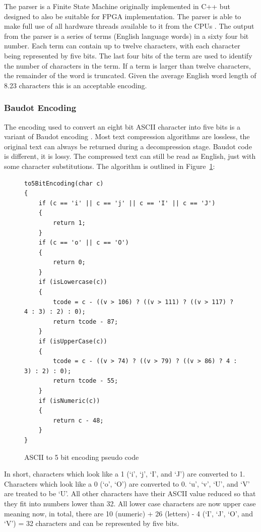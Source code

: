The parser is a Finite State Machine originally implemented in C++ but designed
to also be suitable for FPGA implementation. The parser is able to make full use
of all hardware threads available to it from the CPUs \cite{HybridCPUFPGA}. The
output from the parser is a series of terms (English language words) in a sixty
four bit number. Each term can contain up to twelve characters, with each
character being represented by five bits. The last four bits of the term are
used to identify the number of characters in the term. If a term is larger than
twelve characters, the remainder of the word is truncated. Given the average
English word length of 8.23 characters \cite{englishWordLength} this is an
acceptable encoding.

\subsubsection{Baudot Encoding}

The encoding used to convert an eight bit ASCII character into five bits is a
variant of Baudot encoding \cite{baudotEncoding}. Most text
compression algorithms are lossless, the original text can always be returned
during a decompression stage. Baudot code is different, it is lossy. The
compressed text can still be read as English, just with some character
substitutions. The algorithm is outlined in Figure~\ref{baudotCode}:

\begin{figure}[H]
\small\begin{verbatim}
to5BitEncoding(char c)
{
    if (c == 'i' || c == 'j' || c == 'I' || c == 'J')
    {
        return 1;
    }
    if (c == 'o' || c == 'O')
    {
        return 0;
    }
    if (isLowercase(c))
    {
        tcode = c - ((v > 106) ? ((v > 111) ? ((v > 117) ? 4 : 3) : 2) : 0);
        return tcode - 87;
    }
    if (isUpperCase(c))
    {
        tcode = c - ((v > 74) ? ((v > 79) ? ((v > 86) ? 4 : 3) : 2) : 0);
        return tcode - 55;
    }
    if (isNumeric(c))
    {
        return c - 48;
    }
}
\end{verbatim}
\caption{ASCII to 5 bit encoding pseudo code}
\label{baudotCode}
\end{figure}

In short, characters which look like a 1 (`i', `j', `I', and `J') are converted
to 1. Characters which look like a 0 (`o', `O') are converted to 0. `u', `v',
`U', and `V' are treated to be `U'. All other characters have their ASCII value
reduced so that they fit into numbers lower than 32. All lower case characters
are now upper case meaning now, in total, there are 10 (numeric) + 26 (letters)
- 4 (`I', `J', `O', and `V') = 32 characters and can be represented by five
bits.

